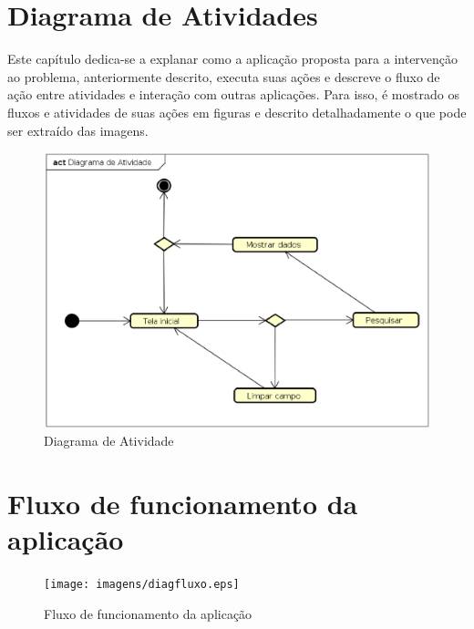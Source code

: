 \section{Diagrama de Atividades}
Este capítulo dedica-se a explanar como a aplicação proposta para a intervenção ao problema, anteriormente descrito, executa suas ações e descreve o fluxo de ação entre atividades e interação com outras aplicações. Para isso, é mostrado os fluxos e atividades de suas ações em figuras e descrito detalhadamente o que pode ser extraído das imagens.



\begin{figure}[!htb]
        \caption{\label{diagact}Diagrama de Atividade}
        \begin{center}
                \includegraphics[width=\textwidth]{imagens/diagact.eps}
        \end{center}
\end{figure}

\newpage
\section{Fluxo de funcionamento da aplicação}
\lipsum[3-7]

\begin{figure}[!htb]
        \caption{\label{diagfluxo}Fluxo de funcionamento da aplicação}
        \begin{center}
                \texttt{[image: imagens/diagfluxo.eps]}
        \end{center}
\end{figure}
